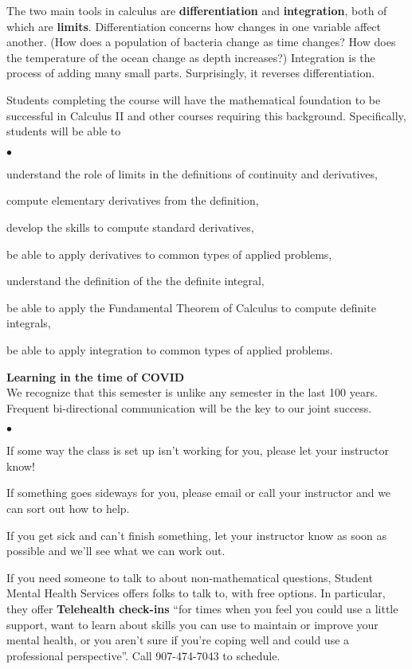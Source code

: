 \documentclass[12pt]{article}
\renewcommand{\emph}[1]{\textsf{\textbf{#1}}}
\newcommand{\localhead}[1]{\par\smallskip\textbf{#1}\nobreak\\}%
\def\heading#1{\localhead{\large\emph{#1}}}
\newenvironment{clist}%
{\bgroup\parskip 0pt\begin{list}{$\bullet$}{\partopsep 4pt\topsep 0pt\itemsep -2pt}}%
{\end{list}\egroup}%
\begin{document}
The two main tools in calculus are \emph{differentiation} and \emph{integration}, both of which are \emph{limits}.  Differentiation concerns how changes in one variable affect another.  (How does a population of bacteria change as time changes?  How does the temperature of the ocean change as depth increases?)  Integration is the process of adding many small parts.  Surprisingly, it reverses differentiation.

Students completing the course will have the mathematical foundation to be successful in Calculus II and other courses
requiring this background.  Specifically, students will be able to

\begin{clist}
\item understand the role of limits in the definitions of continuity and derivatives,
\item compute elementary derivatives from the definition,
\item develop the skills to compute standard derivatives,
\item be able to apply derivatives to common types of applied problems,
\item understand the definition of the the definite integral,
\item be able to apply the Fundamental Theorem of Calculus to
compute definite integrals,
\item be able to apply integration to common types of applied problems.
\end{clist}

\heading{Learning in the time of COVID}
We recognize that this semester is unlike any semester in the last 100 years. Frequent bi-directional communication will be the key to our joint success. 
\begin{clist}
\item If some way the class is set up isn't working for you, please let your instructor know!
\item If something goes sideways for you, please email or call your instructor and we can sort out how to help.
\item If you get sick and can't finish something, let your instructor know as soon as possible and we'll see what we can work out.
\item If you need someone to talk to about non-mathematical questions, Student Mental Health Services offers folks to talk to, with free options. In particular, they offer \emph{Telehealth check-ins} ``for times when you feel you could use a little support, want to learn about skills you can use to maintain or improve your mental health, or you aren't sure if you're coping well and could use a professional perspective''. Call 907-474-7043 to schedule.
\end{clist}
\end{document}
